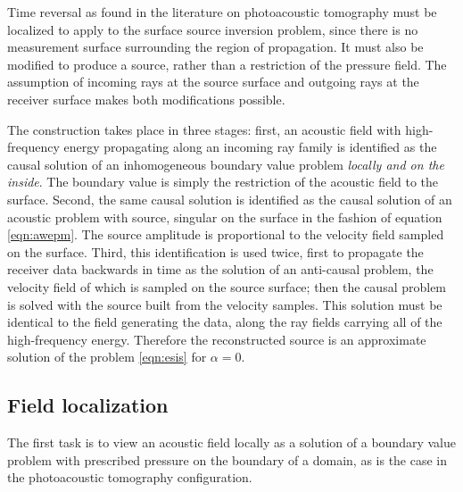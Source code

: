 \documentclass[georeport,12pt]{geophysics}
\begin{document}
Time reversal as found in the literature on photoacoustic tomography
must be localized to apply to the surface source inversion problem,
since there is no measurement surface surrounding the region of
propagation. It must also be modified to produce a source, rather than
a restriction of the pressure field. The assumption of incoming rays at the source surface and
outgoing rays at the receiver surface makes both modifications  
possible.

The construction takes place in three stages: first, an
acoustic field with high-frequency energy propagating along an
incoming ray family is identified as the causal solution of an inhomogeneous boundary value problem {\em locally and on
  the inside}. The boundary value is simply the restriction of the
acoustic field to the surface. Second, the same causal solution is
identified as the causal solution of an acoustic problem with source,
singular on the surface in the fashion of equation
\ref{eqn:awepm}. The source amplitude is proportional to 
the velocity field sampled on the surface. Third, this identification is used twice, first to
propagate the receiver data backwards in time as the solution of an
anti-causal problem,  the velocity field of which is sampled on the
source surface; then the causal problem is solved with the
source built from the velocity samples. This solution must be
identical to the field generating the data, along the ray fields
carrying all of the high-frequency energy. Therefore the reconstructed
source is an approximate solution of the problem \ref{eqn:esis} for
$\alpha=0$.


\subsection{Field localization}
The first task is to view an acoustic field locally as a solution of a
boundary value problem with prescribed pressure on the boundary of a
domain, as is the case in the photoacoustic tomography configuration.
\end{document}
